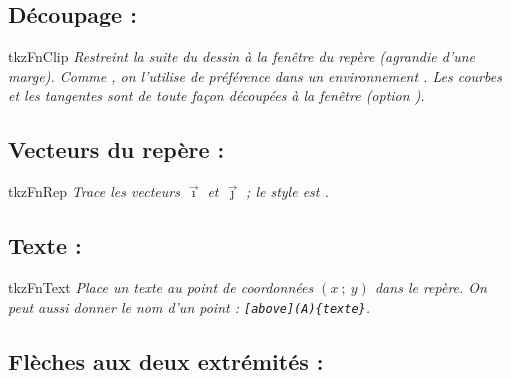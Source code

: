 \subsection{Découpage : }

\begin{NewMacroBox}{tkzFnClip}{}
\emph{Restreint la suite du dessin à la fenêtre du repère (agrandie d'une marge). Comme , on l'utilise de préférence dans un environnement . Les courbes et les tangentes sont de toute façon découpées à la fenêtre (option ).}
\end{NewMacroBox}

\subsection{Vecteurs du repère : }

\begin{NewMacroBox}{tkzFnRep}{}
\emph{Trace les vecteurs $\vec{\imath}$ et $\vec{\jmath}$ ; le style est .}
\end{NewMacroBox}

\subsection{Texte : }

\begin{NewMacroBox}{tkzFnText}{}
\emph{Place un texte au point de coordonnées $(x~;~y)$ dans le repère. On peut aussi donner le nom d'un point : \texttt{[above](A)\{texte\}}.}
\end{NewMacroBox}

\begin{tkzexample}[latex=8cm]
\end{tkzexample}


\subsection{Flèches aux deux extrémités : }\label{sec:arrows}

